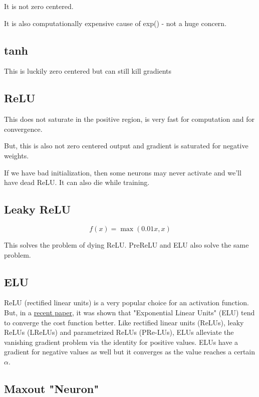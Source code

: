 It is not zero centered.

It is also computationally expensive cause of exp() - not a huge concern.

\subsection{tanh}

This is luckily zero centered but can still kill gradients

\subsection{ReLU}

This does not saturate in the positive region, is very fast for computation and for convergence.

But, this is also not zero centered output and gradient is saturated for negative weights. 

If we have bad initialization, then some neurons may never activate and we'll have dead ReLU. It can also die while training. 

\subsection{Leaky ReLU}

\begin{equation}
    f(x) = \max (0.01x, x)
\end{equation}

This solves the problem of dying ReLU.
PreReLU and ELU also solve the same problem.

\subsection{ELU}

ReLU (rectified linear units) is a very popular choice for an activation function. But, in a \href{https://arxiv.org/pdf/1511.07289.pdf}{recent paper}, it was shown that "Exponential Linear Units" (ELU) tend to converge the cost function better.  Like  rectified linear units (ReLUs), leaky ReLUs (LReLUs) and parametrized ReLUs (PRe-LUs), ELUs alleviate the vanishing gradient problem via the identity for positive values. ELUs have a gradient for negative values as well but it converges as the value reaches a certain $\alpha$.

\subsection{Maxout "Neuron"}

